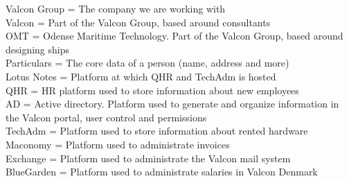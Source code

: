 Valcon Group	=	The company we are working with \\
Valcon 			= 	Part of the Valcon Group, based around consultants \\
OMT 			=	Odense Maritime Technology. Part of the Valcon Group, based around designing ships \\
Particulars 	=	The core data of a person (name, address and more) \\
Lotus Notes		=	Platform at which QHR and TechAdm is hosted	\\
QHR				=	HR platform used to store information about new employees	\\
AD				=	Active directory. Platform used to generate and organize information in the Valcon portal, user control and permissions	\\
TechAdm			=	Platform used to store information about rented hardware	\\
Maconomy		=	Platform used to administrate invoices	\\
Exchange		=	Platform used to administrate the Valcon mail system	\\
BlueGarden		=	Platform used to administrate salaries in Valcon Denmark	\\